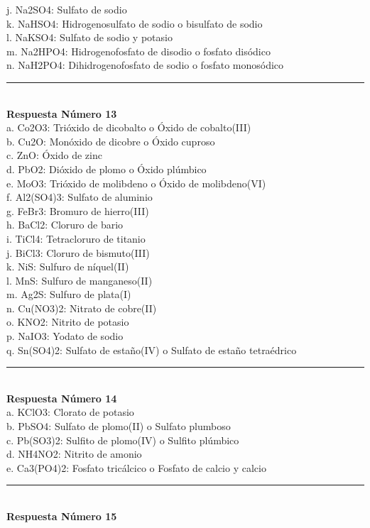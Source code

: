 \documentclass{article}
\begin{document}
j. Na2SO4: Sulfato de sodio\\
k. NaHSO4: Hidrogenosulfato de sodio o bisulfato de sodio\\
l. NaKSO4: Sulfato de sodio y potasio\\
m. Na2HPO4: Hidrogenofosfato de disodio o fosfato disódico\\
n. NaH2PO4: Dihidrogenofosfato de sodio o fosfato monosódico
\noindent\rule{\textwidth}{1pt} \\
\textbf{Respuesta Número 13} \\
a. Co2O3: Trióxido de dicobalto o Óxido de cobalto(III)\\
b. Cu2O: Monóxido de dicobre o Óxido cuproso\\
c. ZnO: Óxido de zinc\\
d. PbO2: Dióxido de plomo o Óxido plúmbico\\
e. MoO3: Trióxido de molibdeno o Óxido de molibdeno(VI)\\
f. Al2(SO4)3: Sulfato de aluminio\\
g. FeBr3: Bromuro de hierro(III)\\
h. BaCl2: Cloruro de bario\\
i. TiCl4: Tetracloruro de titanio\\
j. BiCl3: Cloruro de bismuto(III)\\
k. NiS: Sulfuro de níquel(II)\\
l. MnS: Sulfuro de manganeso(II)\\
m. Ag2S: Sulfuro de plata(I)\\
n. Cu(NO3)2: Nitrato de cobre(II)\\
o. KNO2: Nitrito de potasio\\
p. NaIO3: Yodato de sodio\\
q. Sn(SO4)2: Sulfato de estaño(IV) o Sulfato de estaño tetraédrico\\
\noindent\rule{\textwidth}{1pt} \\
\textbf{Respuesta Número 14} \\
a. KClO3: Clorato de potasio\\
b. PbSO4: Sulfato de plomo(II) o Sulfato plumboso\\
c. Pb(SO3)2: Sulfito de plomo(IV) o Sulfito plúmbico\\
d. NH4NO2: Nitrito de amonio\\
e. Ca3(PO4)2: Fosfato tricálcico o Fosfato de calcio y calcio\\
\noindent\rule{\textwidth}{1pt} \\
\textbf{Respuesta Número 15} \\
\end{document}
